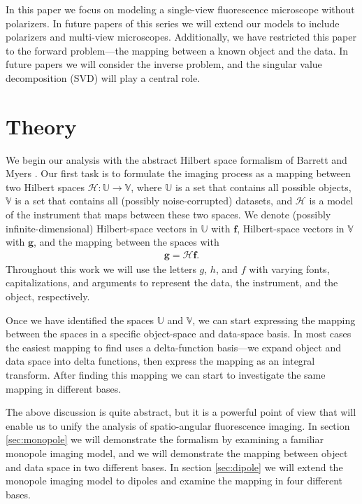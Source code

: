 \documentclass[]{osa-article}
\providecommand{\mb}[1]{\mathbf{#1}}
\providecommand{\mc}[1]{\mathcal{#1}}
\providecommand{\mbb}[1]{\mathbb{#1}}
\begin{document}
In this paper we focus on modeling a single-view fluorescence microscope without
polarizers. In future papers of this series we will extend our models to include
polarizers and multi-view microscopes. Additionally, we have restricted this
paper to the forward problem---the mapping between a known object and the data. In
future papers we will consider the inverse problem, and the singular value
decomposition (SVD) will play a central role.
 
\section{Theory}\label{sec:theory}
We begin our analysis with the abstract Hilbert space formalism of Barrett and
Myers \cite[ch.~1.3]{barrett2004}. Our first task is to formulate
the imaging process as a mapping between two Hilbert spaces
$\mc{H}: \mbb{U} \rightarrow \mbb{V}$, where $\mbb{U}$ is a set that contains
all possible objects, $\mbb{V}$ is a set that contains all (possibly
noise-corrupted) datasets, and $\mc{H}$ is a model of the instrument that maps
between these two spaces. We denote (possibly infinite-dimensional)
Hilbert-space vectors in $\mbb{U}$ with $\mb{f}$, Hilbert-space vectors in
$\mbb{V}$ with $\mb{g}$, and the mapping between the spaces with
\begin{align}
  \mb{g} = \mc{H}\mb{f}.
\end{align}
Throughout this work we will use the letters $g$, $h$, and $f$ with varying
fonts, capitalizations, and arguments to represent the data, the instrument, and
the object, respectively.

Once we have identified the spaces $\mbb{U}$ and $\mbb{V}$, we can start
expressing the mapping between the spaces in a specific object-space and
data-space basis. In most cases the easiest mapping to find uses a
delta-function basis---we expand object and data space into delta functions,
then express the mapping as an integral transform. After finding this mapping we
can start to investigate the same mapping in different bases.

The above discussion is quite abstract, but it is a powerful point of view that
will enable us to unify the analysis of spatio-angular fluorescence imaging.
In section \ref{sec:monopole} we will demonstrate the formalism by examining a
familiar monopole imaging model, and we will demonstrate the mapping between
object and data space in two different bases. In section \ref{sec:dipole} we
will extend the monopole imaging model to dipoles and examine the mapping in
four different bases.
\end{document}
